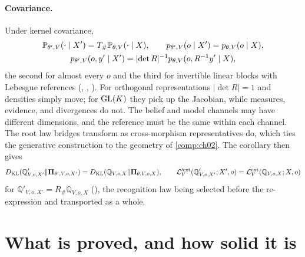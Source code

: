 \paragraph{Covariance.}
Under kernel covariance,
\begin{gather*}
\mathbb P_{\theta',V}(\cdot\mid X')=T_\#\mathbb P_{\theta,V}(\cdot\mid X),
\qquad
p_{\theta',V}(o\mid X')=p_{\theta,V}(o\mid X),\\
p_{\theta',V}(o,y'\mid X')=\lvert\det R\rvert^{-1}p_{\theta,V}(o,R^{-1}y'\mid X),
\end{gather*}
the second for almost every $o$ and the third for invertible linear blocks with Lebesgue references
(, ,
). For orthogonal representations $\lvert\det R\rvert=1$ and densities simply
move; for $\mathrm{GL}(K)$ they pick up the Jacobian, while measures, evidence, and divergences do not. The belief and model
channels may have different dimensions, and the reference must be the same within each channel. The root law
bridges transform as cross-morphism representatives do, which ties the generative construction to the geometry of
\cref{comp:ch02}. The corollary then gives
\[
D_{\mathrm{KL}}(\mathbb Q'_{V,o,X'}\Vert\boldsymbol\Pi_{\theta',V,o,X'})=D_{\mathrm{KL}}(\mathbb Q_{V,o,X}\Vert\boldsymbol\Pi_{\theta,V,o,X}),
\qquad
\mathcal L'^{\mathrm{ext}}_V(\mathbb Q'_{V,o,X'};X',o)=\mathcal L^{\mathrm{ext}}_V(\mathbb Q_{V,o,X};X,o)
\]
for $\mathbb Q'_{V,o,X'}=R_\#\mathbb Q_{V,o,X}$ (), the recognition law being
selected before the re-expression and transported as a whole.

\section{What is proved, and how solid it is}
\label{comp:ch04-status}

